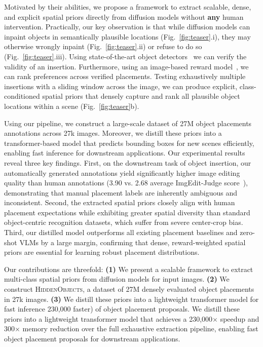 Motivated by their abilities, we propose a framework to extract scalable, dense, and explicit spatial priors directly from diffusion models without \textbf{any} human intervention. Practically, our key observation is that while diffusion models can inpaint objects in semantically plausible locations (Fig.~\ref{fig:teaser}.i), they may otherwise wrongly inpaint (Fig.~\ref{fig:teaser}.ii) or refuse to do so (Fig.~\ref{fig:teaser}.iii). Using state-of-the-art object detectors~\cite{ren2024grounded} we can verify the validity of an insertion. Furthermore, using an image-based reward model~\cite{xu2023imagereward}, we can rank preferences across verified placements. Testing exhaustively multiple insertions with a sliding window across the image, we can produce explicit, class-conditioned spatial priors that densely capture and rank all plausible object locations within a scene (Fig.~\ref{fig:teaser}b).


Using our pipeline, we construct a large-scale dataset of 27M object placements annotations across 27k images. Moreover, we distill these priors into a transformer-based model that predicts bounding boxes for new scenes efficiently, enabling fast inference for downstream applications. Our experimental results reveal three key findings. 
First, on the downstream task of object insertion, our automatically generated annotations yield significantly higher image editing quality than human annotations (3.90 vs. 2.68 average ImgEdit-Judge score~\cite{ye2025imgedit}), demonstrating that manual placement labels are inherently ambiguous and inconsistent. 
Second, the extracted spatial priors closely align with human placement expectations while exhibiting greater spatial diversity than standard object-centric recognition datasets, which suffer from severe center-crop bias.
Third, our distilled model outperforms all existing placement baselines and zero-shot VLMs by a large margin, confirming that dense, reward-weighted spatial priors are essential for learning robust placement distributions.


Our contributions are threefold:
\noindent\textbf{(1)} We present a scalable framework to extract multi-class spatial priors from diffusion models for input images.
\textbf{(2)} We construct \textsc{HiddenObjects}, a dataset of 27M densely evaluated object placements in 27k images.
\textbf{(3)} We distill these priors into a lightweight transformer model for fast inference 230,000 faster) of object placement proposals. 
We distill these priors into a lightweight transformer model that achieves a 230,000$\times$ speedup and 300$\times$ memory reduction over the full exhaustive extraction pipeline, enabling fast object placement proposals for downstream applications.

